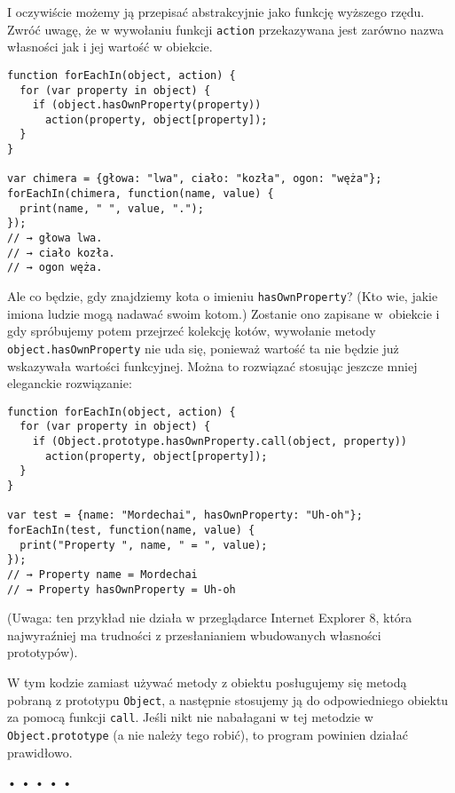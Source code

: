 I oczywiście możemy ją przepisać abstrakcyjnie jako funkcję wyższego rzędu. Zwróć uwagę, że w wywołaniu funkcji \texttt{action} przekazywana jest zarówno nazwa własności jak i jej wartość w obiekcie.

  
\begin{verbatim} 
function forEachIn(object, action) {
  for (var property in object) {
    if (object.hasOwnProperty(property))
      action(property, object[property]);
  }
}

var chimera = {głowa: "lwa", ciało: "kozła", ogon: "węża"};
forEachIn(chimera, function(name, value) {
  print(name, " ", value, ".");
});
// → głowa lwa.
// → ciało kozła.
// → ogon węża.
\end{verbatim}
  
Ale co będzie, gdy znajdziemy kota o imieniu \texttt{hasOwnProperty}? (Kto wie, jakie imiona ludzie mogą nadawać swoim kotom.) Zostanie ono zapisane w~obiekcie i gdy spróbujemy potem przejrzeć kolekcję kotów, wywołanie metody \texttt{object.hasOwnProperty} nie uda się, ponieważ wartość ta nie będzie już wskazywała wartości funkcyjnej. Można to rozwiązać stosując jeszcze mniej eleganckie rozwiązanie:

  
\begin{verbatim} 
function forEachIn(object, action) {
  for (var property in object) {
    if (Object.prototype.hasOwnProperty.call(object, property))
      action(property, object[property]);
  }
}

var test = {name: "Mordechai", hasOwnProperty: "Uh-oh"};
forEachIn(test, function(name, value) {
  print("Property ", name, " = ", value);
});
// → Property name = Mordechai
// → Property hasOwnProperty = Uh-oh
\end{verbatim}
  
(Uwaga: ten przykład nie działa w przeglądarce Internet Explorer 8, która najwyraźniej ma trudności z przesłanianiem wbudowanych własności prototypów).

  
W tym kodzie zamiast używać metody z obiektu posługujemy się metodą pobraną z prototypu \texttt{Object}, a następnie stosujemy ją do odpowiedniego obiektu za pomocą funkcji \texttt{call}. Jeśli nikt nie nabałagani w tej metodzie w \texttt{Object.prototype} (a nie należy tego robić), to program powinien działać prawidłowo.



\begin{center}
• • • • •
\end{center}

